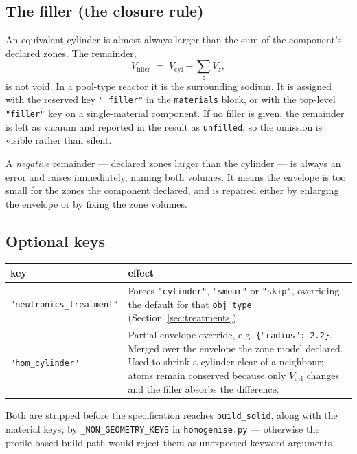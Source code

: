 \documentclass[9pt,a4paper]{extarticle}
\newcommand{\code}[1]{\texttt{\small #1}}
\newcommand{\file}[1]{\texttt{\small #1}}
\begin{document}
\subsection{The filler (the closure rule)}

An equivalent cylinder is almost always larger than the sum of the component's
declared zones. The remainder,
\[
V_{\mathrm{filler}} \;=\; V_{\mathrm{cyl}} - \sum_z V_z ,
\]
is not void. In a pool-type reactor it is the surrounding sodium. It is assigned
with the reserved key \code{"\_filler"} in the \code{materials} block, or with
the top-level \code{"filler"} key on a single-material component. If no filler
is given, the remainder is left as vacuum and reported in the result as
\code{unfilled}, so the omission is visible rather than silent.

A \emph{negative} remainder --- declared zones larger than the cylinder --- is
always an error and raises immediately, naming both volumes. It means the
envelope is too small for the zones the component declared, and is repaired
either by enlarging the envelope or by fixing the zone volumes.

\subsection{Optional keys}

\begin{center}
\begin{tabular}{@{}lp{10.5cm}@{}}
\toprule
key & effect \\
\midrule
\code{"neutronics\_treatment"} &
  Forces \code{"cylinder"}, \code{"smear"} or \code{"skip"}, overriding the
  default for that \code{obj\_type} (Section~\ref{sec:treatments}). \\
\code{"hom\_cylinder"} &
  Partial envelope override, e.g. \code{\{"radius": 2.2\}}. Merged over the
  envelope the zone model declared. Used to shrink a cylinder clear of a
  neighbour; atoms remain conserved because only $V_{\mathrm{cyl}}$ changes and
  the filler absorbs the difference. \\
\bottomrule
\end{tabular}
\end{center}

\noindent
Both are stripped before the specification reaches \code{build\_solid}, along
with the material keys, by \code{\_NON\_GEOMETRY\_KEYS} in \file{homogenise.py}
--- otherwise the profile-based build path would reject them as unexpected
keyword arguments.
\end{document}
